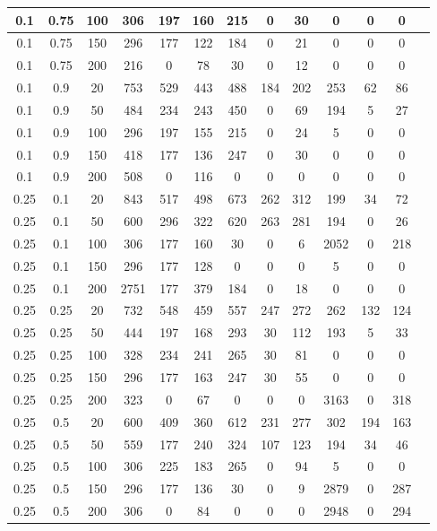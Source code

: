 \begin{table}[H]
\begin{tabular}{|c|c|c|c|c|c|c|c|c|c|c|c|c|}
0.1 & 0.75 & 100 & 306 & 197 & 160 & 215 & 0 & 30 & 0 & 0 & 0 \\ \hline
0.1 & 0.75 & 150 & 296 & 177 & 122 & 184 & 0 & 21 & 0 & 0 & 0 \\ \hline
0.1 & 0.75 & 200 & 216 & 0 & 78 & 30 & 0 & 12 & 0 & 0 & 0 \\ \hline
0.1 & 0.9 & 20 & 753 & 529 & 443 & 488 & 184 & 202 & 253 & 62 & 86 \\ \hline
0.1 & 0.9 & 50 & 484 & 234 & 243 & 450 & 0 & 69 & 194 & 5 & 27 \\ \hline
0.1 & 0.9 & 100 & 296 & 197 & 155 & 215 & 0 & 24 & 5 & 0 & 0 \\ \hline
0.1 & 0.9 & 150 & 418 & 177 & 136 & 247 & 0 & 30 & 0 & 0 & 0 \\ \hline
0.1 & 0.9 & 200 & 508 & 0 & 116 & 0 & 0 & 0 & 0 & 0 & 0 \\ \hline
0.25 & 0.1 & 20 & 843 & 517 & 498 & 673 & 262 & 312 & 199 & 34 & 72 \\ \hline
0.25 & 0.1 & 50 & 600 & 296 & 322 & 620 & 263 & 281 & 194 & 0 & 26 \\ \hline
0.25 & 0.1 & 100 & 306 & 177 & 160 & 30 & 0 & 6 & 2052 & 0 & 218 \\ \hline
0.25 & 0.1 & 150 & 296 & 177 & 128 & 0 & 0 & 0 & 5 & 0 & 0 \\ \hline
0.25 & 0.1 & 200 & 2751 & 177 & 379 & 184 & 0 & 18 & 0 & 0 & 0 \\ \hline
0.25 & 0.25 & 20 & 732 & 548 & 459 & 557 & 247 & 272 & 262 & 132 & 124 \\ \hline
0.25 & 0.25 & 50 & 444 & 197 & 168 & 293 & 30 & 112 & 193 & 5 & 33 \\ \hline
0.25 & 0.25 & 100 & 328 & 234 & 241 & 265 & 30 & 81 & 0 & 0 & 0 \\ \hline
0.25 & 0.25 & 150 & 296 & 177 & 163 & 247 & 30 & 55 & 0 & 0 & 0 \\ \hline
0.25 & 0.25 & 200 & 323 & 0 & 67 & 0 & 0 & 0 & 3163 & 0 & 318 \\ \hline
0.25 & 0.5 & 20 & 600 & 409 & 360 & 612 & 231 & 277 & 302 & 194 & 163 \\ \hline
0.25 & 0.5 & 50 & 559 & 177 & 240 & 324 & 107 & 123 & 194 & 34 & 46 \\ \hline
0.25 & 0.5 & 100 & 306 & 225 & 183 & 265 & 0 & 94 & 5 & 0 & 0 \\ \hline
0.25 & 0.5 & 150 & 296 & 177 & 136 & 30 & 0 & 9 & 2879 & 0 & 287 \\ \hline
0.25 & 0.5 & 200 & 306 & 0 & 84 & 0 & 0 & 0 & 2948 & 0 & 294 \\ \hline

\end{tabular}
\end{table}
